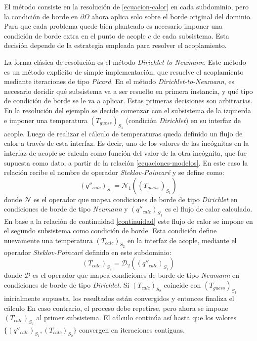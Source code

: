 El método consiste en la resolución de \ref{ecuacion-calor} en cada subdominio,
pero la condición de borde en $\partial \Omega$ ahora aplica solo sobre el borde original del dominio.
Para que cada problema quede bien planteado es necesario imponer una condición de borde extra en el punto de acople $c$ de cada subsistema.
Esta decisión depende de la estrategia empleada para resolver el acoplamiento.

La forma clásica de resolución es el método \textit{Dirichlet-to-Neumann}.
Este método es un método explícito de simple implementación, que resuelve el acoplamiento mediante iteraciones de tipo \textit{Picard}.
En el método \textit{Dirichlet-to-Neumann}, es necesario decidir qué subsistema va a ser resuelto en primera instancia,
y qué tipo de condición de borde se le va a aplicar.
Estas primeras decisiones son arbitrarias.
En la resolución del ejemplo se decide comenzar con el subsistema de la izquierda e
imponer una temperatura $(T_{guess})_{S_1}$ (condición \textit{Dirichlet}) en su interfaz de acople.
Luego de realizar el cálculo de temperaturas queda definido un flujo de calor a través de esta interfaz.
Es decir, uno de los valores de las incógnitas en la interfaz de acople se calcula como función del valor de la otra incógnita, 
que fue supuesta como dato, a partir de la relación \ref{ecuaciones-modelos}.
En este caso la relación recibe el nombre de operador \textit{Steklov-Poincaré} y se define como:
\begin{equation}
(q''_{calc})_{S_1} = \mathscr{N}_1\left ((T_{guess})_{S_1}\right )
\label{q_n_t}
\end{equation}
donde $\mathscr{N}$ es el operador que mapea condiciones de borde de tipo \textit{Dirichlet} en condiciones de borde de tipo \textit{Neumann}
y $(q''_{calc})_{S_1}$ es el flujo de calor calculado.
En base a la relación de continuidad \ref{continuidad} este flujo de calor se impone en el segundo subsistema como condición de borde.
Esta condición define nuevamente una temperatura $(T_{calc})_{S_2}$ en la interfaz de acople, mediante el operador \textit{Steklov-Poincaré} definido en este subdominio:
\begin{equation}
(T_{calc})_{S_2} = \mathscr{D}_2\left ((q''_{calc})_{S_1}\right )
\label{t_d_q}
\end{equation}
donde $\mathscr{D}$ es el operador que mapea condiciones de borde de tipo \textit{Neumann} en condiciones de borde de tipo \textit{Dirichlet}.
Si $(T_{calc})_{S_2}$ coincide con $(T_{guess})_{S_1}$ inicialmente supuesta,
los resultados están convergidos y entonces finaliza el cálculo
En caso contrario, el proceso debe repetirse, pero ahora se impone $(T_{calc})_{S_2}$ al primer subsistema.
El cálculo continúa así hasta que los valores $\{(q''_{calc})_{S_1}, (T_{calc})_{S_2}\}$ convergen en iteraciones contiguas.

